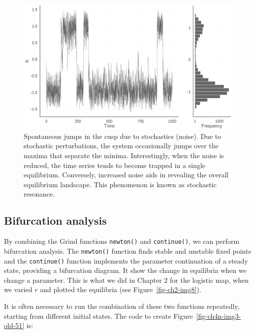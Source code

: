 \documentclass[
  a4paper,
  DIV=11,
  numbers=noendperiod,
  oneside]{scrreprt}
\begin{document}
\begin{figure}

{\centering \includegraphics{media/ch4n/fig-ch4n-img2-old-50.jpg}

}

\caption{\label{fig-ch4n-img2-old-50}Spontaneous jumps in the cusp due
to stochastics (noise). Due to stochastic perturbations, the system
occasionally jumps over the maxima that separate the minima.
Interestingly, when the noise is reduced, the time series tends to
become trapped in a single equilibrium. Conversely, increased noise aids
in revealing the overall equilibrium landscape. This phenomenon is known
as stochastic resonance.}

\end{figure}

\hypertarget{sec-Bifurcation-analysis}{%
\subsection{Bifurcation analysis}\label{sec-Bifurcation-analysis}}

By combining the Grind functions \texttt{newton()} and
\texttt{continue()}, we can perform bifurcation analysis. The
\texttt{newton()} function finds stable and unstable fixed points and
the \texttt{continue()} function implements the parameter continuation
of a steady state, providing a bifurcation diagram. It show the change
in equilibria when we change a parameter. This is what we did in Chapter
2 for the logistic map, when we varied \(r\) and plotted the equilibria
(see Figure~\ref{fig-ch2-img8}).

It is often necessary to run the combination of these two functions
repeatedly, starting from different initial states. The code to create
Figure~\ref{fig-ch4n-img3-old-51} is:
\end{document}
